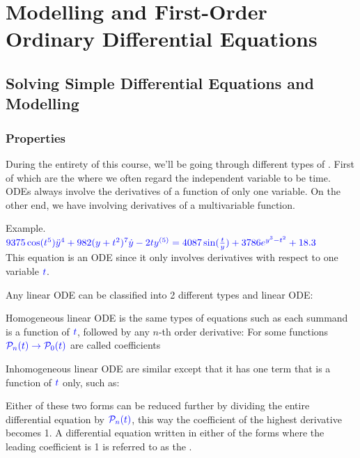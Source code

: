 \documentclass[11pt, openright]{book}
\begin{document}




\chapter{Modelling and First-Order Ordinary Differential Equations}

\section{Solving Simple Differential Equations and Modelling}

\subsection{Properties}

During the entirety of this course, we'll be going through different types of . First of which are the  where we often regard the independent variable to be time. ODEs always involve the derivatives of a function of only one variable. On the other end, we have  involving derivatives of a multivariable function.
\begin{dent}{Example.}
    $\color{blue} 9375\cos(t^5)\ddot{y}^4+982(y+t^2)^7\dot{y}-2ty^{(5)}=4087\sin(\frac{t}{y})+3786e^{y^3-t^2}+18.3$\\
    This equation is an ODE since it only involves derivatives with respect to one variable $\color{blue} t$.

\end{dent}

Any linear ODE can be classified into 2 different types  and  linear ODE:
\begin{items}{-15pt}{-15pt}
    \item Homogeneous linear ODE is the same types of equations such as each summand is a function of $\color{blue} t$, followed by any $n$-th order derivative:
    \tab For some functions $\color{blue} \mathcal{P}_{n}(t)\to\mathcal{P}_0(t)$ are called coefficients
    \item Inhomogeneous linear ODE are similar except that it has one term that is a function of $\color{blue} t$ only, such as:
\end{items}
Either of these two forms can be reduced further by dividing the entire differential equation by $\color{blue} \mathcal{P}_n(t)$, this way the coefficient of the highest derivative becomes 1. A differential equation written in either of the forms where the leading coefficient is 1 is referred to as the .
\end{document}

